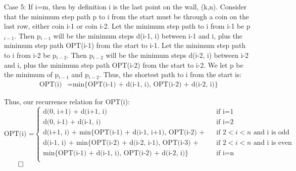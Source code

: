 \documentclass[11pt]{article}
\begin{document}
Case 5: If i=m, then by definition i is the last point on the wall, (k,n). Consider that the minimum step path p to i from the start must be through a coin on the last row, either coin i-1 or coin i-2. Let the minimum step path to i from i-1 be p$_{i-1}$. Then p$_{i-1}$ will be the minimum steps d(i-1, i) between i-1 and i, plus the minimum step path OPT(i-1) from the start to i-1. Let the minimum step path to i from i-2 be p$_{i-2}$. Then p$_{i-2}$ will be the minimum steps d(i-2, i) between i-2 and i, plus the minimum step path OPT(i-2) from the start to i-2. We let p be the minimum of p$_{i-1}$ and p$_{i-2}$. Thus, the shortest path to i from the start is:
\begin{align*}
\text{OPT(i)} &= \text{min\{OPT(i-1) + d(i-1, i), OPT(i-2) + d(i-2, i)\}}
\end{align*}

Thus, our recurrence relation for OPT(i):
\[
\text{OPT(i) =} 
\begin{cases} 
      \text{d(0, i+1) + d(i+1, i)} & \text{if i=1} \\
      \text{d(0, i-1) + d(i-1, i)} & \text{if i=2} \\
	  \text{d(i+1, i) + min\{OPT(i-1) + d(i-1, i+1), OPT(i-2) + d(i-2, i+1)\}} & \text{if $2 < i < n$ and i is odd} \\
	  \text{d(i-1, i) + min\{OPT(i-2) + d(i-2, i-1), OPT(i-3) + d(i-3, i-1)\}} & \text{if $2 < i < n$ and i is even} \\
	  \text{min\{OPT(i-1) + d(i-1, i), OPT(i-2) + d(i-2, i)\}} & \text{if i=n} \\
   \end{cases}
\]
$\qed$
\end{document}
